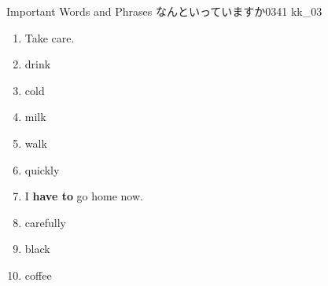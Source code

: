 \documentclass[aspectratio=169,xcolor={dvipsnames,table}]{beamer}
\begin{document}
\begin{frame}[plain,t]{Important Words and Phrases}
  なんといっていますか\hfill{\tiny 0341}\,{\scriptsize {}\,kk\_03}

  \pause

  \Large
  \vspace{-8pt}
  \begin{enumerate}[<+- |alert@+>]\setlength{\itemsep}{-1pt}
    \item Take care.
    \item drink
    \item cold
    \item milk
    \item walk
    \item quickly
    \item I \textbf{have to} go home now.
    \item carefully
    \item black
    \item coffee
  \end{enumerate}

\end{frame}
\end{document}

